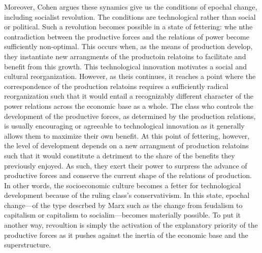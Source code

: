 \documentclass[letterpaper,notitlepage,12pt]{article}
\begin{document}
Moreover, Cohen argues these synamics give us the conditions of epochal change,
including socialist revolution.
The conditions are technological rather than social or political.
Such a revolution becomes possible in a state of fettering: whe nthe
contradiction between the productive forces and the relations of power become
sufficiently non-optimal.
This occurs when, as the means of production develop, they instantiate new
arrangments of the productoin relatoins to facilitate and benefit from this
growth.
This technological innovation motivates a social and cultural reorganization.
However, as theis continues, it reaches a point where the correspondence of the
production relatoins requires a sufficiently radical reorganization such that it
would entail a recognizably different character of the power relations across
the economic base as a whole.
The class who controls the development of the productive forces, as determined
by the production relations, is usually encouraging or agreeable to
technological innovation as it generally allows them to maximize their own
benefit.
At this point of fettering, however, the level of development depends on a new
arrangment of production relatoins such that it would constitute a detriment to
the share of the benefits they previously enjoyed.
As such, they exert their power to surpress the advance of productive forces and
conserve the current shape of the relations of production.
In other words, the socioeconomic culture becomes a fetter for technological
development because of the ruling class's conservativism.
In this state, epochal change---of the type descrbed by Marx such as the change
from feudalism to capitalism or capitalism to socialim---becomes materially
possible.
To put it another way, revoultion is simply the activation of the explanatory
priority of the productive forces as it pushes against the inertia of the
economic base and the superstructure.
\end{document}
